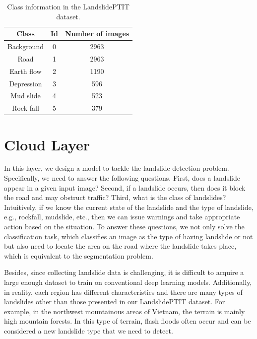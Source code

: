\documentclass{ieeeaccess}
\newcommand{\baobq}[1]{\textcolor{orange}{#1}}
\begin{document}
\begin{table}[t]
\caption{Class information in the LandslidePTIT dataset.}
\centering
\begin{tabular}{|c|c|c|}
\hline
Class      & Id & Number of images \\ \hline
Background & 0  & 2963             \\ \hline
Road       & 1  & 2963             \\ \hline
Earth flow & 2  & 1190             \\ \hline
Depression & 3  & 596              \\ \hline
Mud slide  & 4  & 523              \\ \hline
Rock fall  & 5  & 379              \\ \hline
\end{tabular}
\label{tab:classes}
\end{table}


\section{Cloud Layer}

In this layer, we design a model to tackle the landslide detection problem. Specifically, we need to answer the following questions. First, does a landslide appear in a given input image? Second, if a landslide occurs, then does it block the road and may obstruct traffic? Third, what is the class of landslides? Intuitively, if we know the current state of the landslide and the type of landslide, e.g., rockfall, mudslide, etc., then we can issue warnings and take appropriate action based on the situation. To answer these questions, we not only solve the classification task, which classifies an image as the type of having landslide or not but also need to locate the area on the road where the landslide takes place, which is equivalent to the segmentation problem. 

Besides, since collecting landslide data is challenging, it is difficult to acquire a large enough dataset to train on conventional deep learning models. Additionally, in reality, each region has different characteristics and there are many types of landslides other than those presented in our LandslidePTIT dataset. For example, in the northwest mountainous areas of Vietnam, the terrain is mainly high mountain forests. In this type of terrain, flash floods often occur and can be considered a new landslide type that we need to detect.
\end{document}
